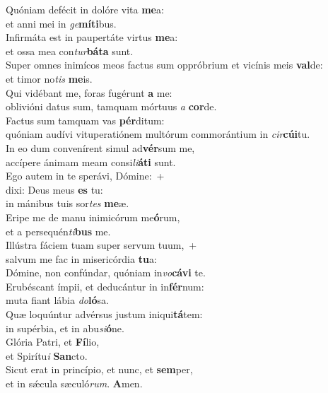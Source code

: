 \evenverse Quóniam defécit in dolóre vita \textbf{me}a:~\*\\
\evenverse et anni mei in \textit{ge}\textbf{mí}\textbf{ti}bus.\\
\oddverse Infirmáta est in paupertáte virtus \textbf{me}a:~\*\\
\oddverse et ossa mea con\textit{tur}\textbf{bá}\textbf{ta} sunt.\\
\evenverse Super omnes inimícos meos factus sum oppróbrium et vicínis meis \textbf{val}de:~\*\\
\evenverse et timor no\textit{tis} \textbf{me}is.\\
\oddverse Qui vidébant me, foras fugérunt \textbf{a} me:~\*\\
\oddverse oblivióni datus sum, tamquam mórtuus \textit{a} \textbf{cor}de.\\
\evenverse Factus sum tamquam vas \textbf{pér}ditum:~\*\\
\evenverse quóniam audívi vituperatiónem multórum commorántium in \textit{cir}\textbf{cú}\textbf{i}tu.\\
\oddverse In eo dum convenírent simul ad\textbf{vér}sum me,~\*\\
\oddverse accípere ánimam meam consi\textit{li}\textbf{á}\textbf{ti} sunt.\\
\evenverse Ego autem in te sperávi, Dómine:~+\\
\evenverse  dixi: Deus meus \textbf{es} tu:~\*\\
\evenverse in mánibus tuis sor\textit{tes} \textbf{me}æ.\\
\oddverse Eripe me de manu inimicórum me\textbf{ó}rum,~\*\\
\oddverse et a persequén\textit{ti}\textbf{bus} me.\\
\evenverse Illústra fáciem tuam super servum tuum,~+\\
\evenverse  salvum me fac in misericórdia \textbf{tu}a:~\*\\
\evenverse Dómine, non confúndar, quóniam in\textit{vo}\textbf{cá}\textbf{vi} te.\\
\oddverse Erubéscant ímpii, et deducántur in in\textbf{fér}num:~\*\\
\oddverse muta fiant lábia \textit{do}\textbf{ló}sa.\\
\evenverse Quæ loquúntur advérsus justum iniqui\textbf{tá}tem:~\*\\
\evenverse in supérbia, et in abu\textit{si}\textbf{ó}ne.\\
\oddverse Glória Patri, et \textbf{Fí}lio,~\*\\
\oddverse et Spirítu\textit{i} \textbf{San}cto.\\
\evenverse Sicut erat in princípio, et nunc, et \textbf{sem}per,~\*\\
\evenverse et in sǽcula sæculó\textit{rum}. \textbf{A}men.\\

